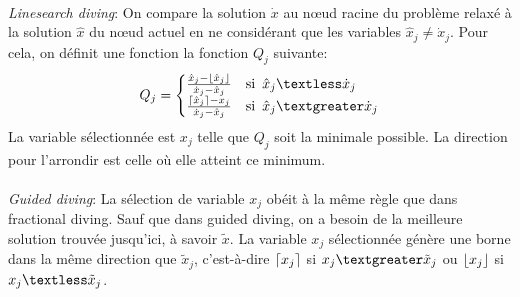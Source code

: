 \documentclass[12pt,a4paper,oneside]{book}
\theoremstyle{definition}
\DeclarePairedDelimiter\ceil{\lceil}{\rceil}
\DeclarePairedDelimiter\floor{\lfloor}{\rfloor}
\begin{document}
	\paragraph{}
	\textit{Linesearch diving}: On compare la solution $\dot{x}$ au nœud racine du problème relaxé à la solution $\hat{x}$ du nœud actuel en ne considérant que les variables $\hat{x}_j \neq \dot{x}_j$. Pour cela, on définit une fonction la fonction $Q_j$ suivante:
	\[
		Q_j = \begin{cases}
		\frac{\hat{x}_j - \floor{\hat{x}_j}}{\dot{x}_j - \hat{x}_j} & \text{si} \hspace{5pt} \hat{x}_j \textless \dot{x}_j \\
		\frac{\ceil{\hat{x}_j }- {x}_j}{\dot{x}_j - \hat{x}_j} & \text{si} \hspace{5pt} \hat{x}_j \textgreater \dot{x}_j \\ 
		\end{cases}
	\] 	
	La variable sélectionnée est $x_j$ telle que $Q_j$ soit la minimale possible. La direction pour l'arrondir est celle où elle atteint ce minimum.

	\paragraph{}
	\textit{Guided diving}: La sélection de variable $x_j$ obéit à la même règle que dans fractional diving. Sauf que dans guided diving, on a besoin de la meilleure solution trouvée jusqu'ici, à savoir $\tilde{x}$. La variable $x_j$ sélectionnée génère une borne dans la même direction que $\tilde{x}_j$, c'est-à-dire $\ceil{x_j}$ si $ x_j \textgreater \tilde{x}_j $ ou $\floor{x_j}$ si $ x_j \textless \tilde{x}_j $.
	
\end{document}
